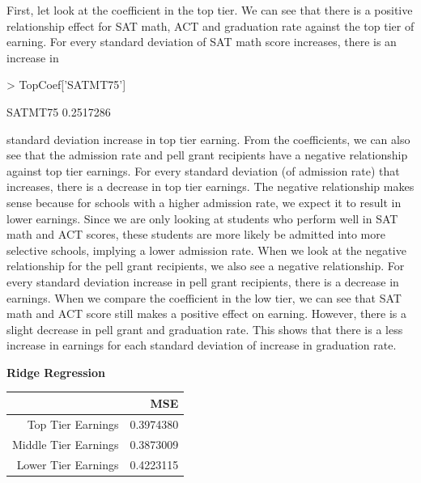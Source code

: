 \documentclass{article}
\begin{document}
First, let look at the coefficient in the top tier.  We can see that there is a positive relationship effect for SAT math, ACT and graduation rate against the top tier of earning.  For every standard deviation of SAT math score increases, there is an increase in 
\begin{Schunk}
\begin{Sinput}
> TopCoef['SATMT75']
\end{Sinput}
\begin{Soutput}
  SATMT75 
0.2517286 
\end{Soutput}
\end{Schunk}
standard deviation increase in top tier earning. From the coefficients, we can also see that the admission rate and pell grant recipients have a negative relationship against top tier earnings.  For every standard deviation (of admission rate) that increases, there is a decrease in top tier earnings.  The negative relationship makes sense because for schools with a higher admission rate, we expect it to result in lower earnings.  Since we are only looking at students who perform well in SAT math and ACT scores, these students are more likely be admitted into more selective schools, implying a lower admission rate.  When we look at the negative relationship for the pell grant recipients, we also see a negative relationship.  For every standard deviation increase in pell grant recipients, there is a decrease in earnings. 
When we compare the coefficient in the low tier, we can see that SAT math and ACT score still makes a positive effect on earning. However, there is a slight decrease in pell grant and graduation rate.  This shows that there is a less increase in earnings for each standard deviation of increase in graduation rate. 
\newline
\newline

\textbf{Ridge Regression}\newline
\begin{table}[ht]
\centering
\begin{tabular}{rr}
  \hline
 & MSE \\ 
  \hline
Top Tier Earnings & 0.3974380 \\ 
  Middle Tier Earnings & 0.3873009 \\ 
  Lower Tier Earnings & 0.4223115 \\ 
   \hline
\end{tabular}
\end{table}\newline
\end{document}
